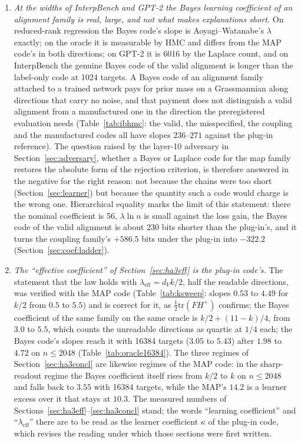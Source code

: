 \documentclass[11pt,a4paper]{article}
\newcommand{\dv}{d_V}
\begin{document}
\begin{enumerate}
\item \emph{At the widths of InterpBench and GPT-2 the Bayes learning coefficient of an alignment family is real, large, and not what makes explanations short.} On reduced-rank regression the Bayes code's slope is Aoyagi--Watanabe's $\lambda$ exactly; on the oracle it is measurable by HMC and differs from the MAP code's in both directions; on GPT-2 it is 6016 by the Laplace count, and on InterpBench the genuine Bayes code of the valid alignment is longer than the label-only code at 1024 targets. A Bayes code of an alignment family attached to a trained network pays for prior mass on a Grassmannian along directions that carry no noise, and that payment does not distinguish a valid alignment from a manufactured one in the direction the preregistered evaluation needs (Table~\ref{tab:ibhmc}: the valid, the misspecified, the coupling and the manufactured codes all have slopes $236$--$271$ against the plug-in reference). The question raised by the layer-10 adversary in Section~\ref{sec:adversary}, whether a Bayes or Laplace code for the map family restores the absolute form of the rejection criterion, is therefore answered in the negative for the right reason: not because the chains were too short (Section~\ref{sec:learner}) but because the quantity such a code would charge is the wrong one. Hierarchical equality marks the limit of this statement: there the nominal coefficient is 56, $\lambda\ln n$ is small against the loss gain, the Bayes code of the valid alignment is about 230 bits shorter than the plug-in's, and it turns the coupling family's $+586.5$ bits under the plug-in into $-322.2$ (Section~\ref{sec:coef:ladder}).
\item \emph{The ``effective coefficient'' of Section~\ref{sec:ha3eff} is the plug-in code's.} The statement that the law holds with $\lambda_{\mathrm{eff}}=\dv k/2$, half the readable directions, was verified with the MAP code (Table~\ref{tab:ksweep}: slopes $0.53$ to $4.49$ for $k/2$ from $0.5$ to $5.5$) and is correct for it, as $\tfrac12\mathrm{tr}(FH^{+})$ confirms; the Bayes coefficient of the same family on the same oracle is $k/2+(11-k)/4$, from $3.0$ to $5.5$, which counts the unreadable directions as quartic at $1/4$ each; the Bayes code's slopes reach it with 16384 targets ($3.05$ to $5.43$) after $1.98$ to $4.72$ on $n\le2048$ (Table~\ref{tab:oracle16384}). The three regimes of Section~\ref{sec:ha3concl} are likewise regimes of the MAP code: in the sharp-readout regime the Bayes coefficient itself rises from $k/2$ to $k$ on $n\le2048$ and falls back to $3.55$ with 16384 targets, while the MAP's $14.2$ is a learner excess over it that stays at $10.3$. The measured numbers of Sections~\ref{sec:ha3eff}--\ref{sec:ha3concl} stand; the words ``learning coefficient'' and ``$\lambda_{\mathrm{eff}}$'' there are to be read as the learner coefficient $\kappa$ of the plug-in code, which revises the reading under which those sections were first written.

\end{enumerate}
\end{document}
